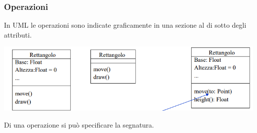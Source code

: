 \documentclass{article}
\begin{document}
	\subsubsection{Operazioni}
	In UML le operazioni sono indicate graficamente in una sezione al di sotto degli attributi.
	\begin{center}
		\includegraphics[scale=0.6]{assets/uml_operazioni.png}
	\end{center}
	Di una operazione si può specificare la segnatura.
\end{document}
